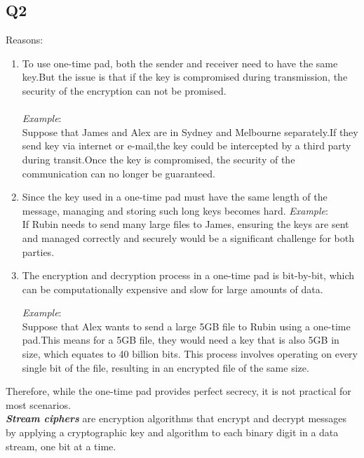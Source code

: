 \documentclass{article}
\begin{document}
\subsection{Q2}
	Reasons:
	\begin{enumerate}
		\item To use one-time pad, both the sender and receiver need to have the same key.But the issue is that if the key is compromised during transmission, the security of the encryption can not be promised.\\\\
		\textit{Example}:\\
		Suppose that James and Alex are in Sydney and Melbourne separately.If they send key via internet or e-mail,the key could be intercepted by a third party during transit.Once the key is compromised, the security of the communication can no longer be guaranteed.

		\item Since the key used in a one-time pad must have the same length of the message, managing and storing such long keys becomes hard.
		\textit{Example}:\\
		If Rubin needs to send many large files to James, ensuring the keys are sent and managed correctly and securely would be a significant challenge for both parties.

		\item The encryption and decryption process in a one-time pad is bit-by-bit, which can be computationally expensive and slow for large amounts of data.

		\textit{Example}:\\
		Suppose that Alex wants to send a large 5GB file to Rubin using a one-time pad.This means for a 5GB file, they would need a key that is also 5GB in size, which equates to 40 billion bits. This process involves operating on every single bit of the file, resulting in an encrypted file of the same size.

	\end{enumerate}
	Therefore, while the one-time pad provides perfect secrecy, it is not practical for most scenarios.\\

\newpage
	\textbf{\textit{Stream ciphers}} are encryption algorithms that encrypt and decrypt messages by applying a cryptographic key and algorithm to each binary digit in a data stream, one bit at a time\cite{OktaStreamCipher}.
\end{document}
